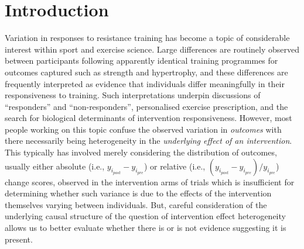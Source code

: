 \documentclass[
]{article}
\begin{document}
\section{Introduction}\label{introduction}

Variation in responses to resistance training has become a topic of
considerable interest within sport and exercise science. Large
differences are routinely observed between participants following
apparently identical training programmes for outcomes captured such as
strength and hypertrophy, and these differences are frequently
interpreted as evidence that individuals differ meaningfully in their
responsiveness to training. Such interpretations underpin discussions of
``responders'' and ``non-responders'', personalised exercise
prescription, and the search for biological determinants of intervention
responsiveness. However, most people working on this topic confuse the
observed variation in \emph{outcomes} with there necessarily being
heterogeneity in the \emph{underlying effect of an intervention}. This
typically has involved merely considering the distribution of outcomes,
usually either absolute (i.e., \(y_{i_{post}}-y_{i_{pre}}\)) or relative
(i.e., \((y_{i_{post}}-y_{i_{pre}})/y_{i_{pre}}\)) change scores,
observed in the intervention arms of trials which is insufficient for
determining whether such variance is due to the effects of the
intervention themselves varying between individuals. But, careful
consideration of the underlying causal structure of the question of
intervention effect heterogeneity allows us to better evaluate whether
there is or is not evidence suggesting it is present.
\end{document}
